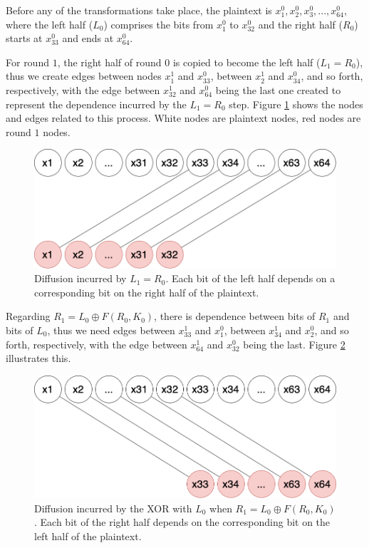 \documentclass{report}
\begin{document}
Before any of the transformations take place, the plaintext is $x_1^0, x_2^0, x_3^0, ..., x_{64}^0$, where the left half ($L_0$) comprises the bits from $x_1^0$ to $x_{32}^0$ and the right half ($R_0$) starts at $x_{33}^0$ and ends at $x_{64}^0$.

For round $1$, the right half of round $0$ is copied to become the left half ($L_1 = R_0$), thus we create edges between nodes $x_1^1$ and $x_{33}^0$, between $x_2^1$ and $x_{34}^0$, and so forth, respectively, with the edge between $x_{32}^1$ and $x_{64}^0$ being the last one created to represent the dependence incurred by the $L_1 = R_0$ step. Figure \ref{fig:feistel-step-1} shows the nodes and edges related to this process. White nodes are plaintext nodes, red nodes are round $1$ nodes.

\begin{figure}[h!]
    \centering
    \includegraphics[scale=0.3]{Grafo_DES-L1equalsR0.png}
    \caption{Diffusion incurred by $L_1 = R_0$. Each bit of the left half depends on a corresponding bit on the right half of the plaintext.}
    \label{fig:feistel-step-1}
\end{figure}

Regarding $R_1 = L_0 \oplus F(R_0, K_0)$, there is dependence between bits of $R_1$ and bits of $L_0$, thus we need edges between $x_{33}^1$ and $x_1^0$, between $x_{34}^1$ and $x_2^0$, and so forth, respectively, with the edge between $x_{64}^1$ and $x_{32}^0$ being the last. Figure \ref{fig:feistel-step-2} illustrates this. 

\begin{figure}[h!]
    \centering
    \includegraphics[scale=0.3]{Grafo_DES-R1equalsL0XOR.png}
    \caption{Diffusion incurred by the XOR with $L_0$ when $R_1 = L_0 \oplus F(R_0, K_0)$. Each bit of the right half depends on the corresponding bit on the left half of the plaintext.}
    \label{fig:feistel-step-2}
\end{figure}
\end{document}

